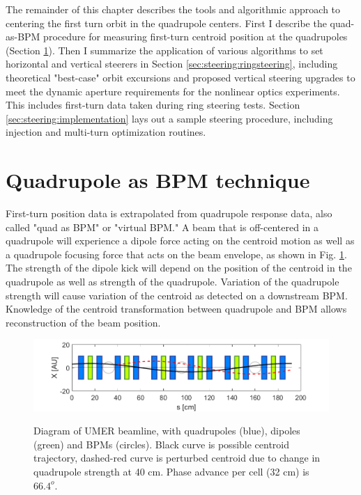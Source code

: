 The remainder of this chapter describes the tools and algorithmic approach to centering the first turn orbit in the quadrupole centers. First I describe the quad-as-BPM procedure for measuring first-turn centroid position at the quadrupoles (Section \ref{sec:steering:quad-as-bpm}). Then I summarize the application of various algorithms to set horizontal and vertical steerers in Section \ref{sec:steering:ringsteering}, including theoretical "best-case" orbit excursions and proposed vertical steering upgrades to meet the dynamic aperture requirements for the nonlinear optics experiments. This includes first-turn data taken during ring steering tests.
Section \ref{sec:steering:implementation} lays out a sample steering procedure, including injection and multi-turn optimization routines. 



 

\section{Quadrupole as BPM technique} \label{sec:steering:quad-as-bpm}

First-turn position data is extrapolated from quadrupole response data, also called "quad as BPM" or "virtual BPM." A beam that is off-centered in a quadrupole will experience a dipole force acting on the centroid motion as well as a quadrupole focusing force that acts on the beam envelope, as shown in Fig. \ref{fig:simple-beamline}. The strength of the dipole kick will depend on the position of the centroid in the quadrupole as well as strength of the quadrupole. Variation of the quadrupole strength will cause variation of the centroid as detected on a downstream BPM. Knowledge of the centroid transformation between quadrupole and BPM allows reconstruction of the beam position. 


\begin{figure}
\begin{center}
\includegraphics[width=\textwidth]{4.figures/simple_beamline.png}
\end{center}
\renewcommand{\baselinestretch}{1}
\small\normalsize
\begin{quote}
\caption[]{Diagram of UMER beamline, with quadrupoles (blue), dipoles (green) and BPMs (circles). Black curve is possible centroid trajectory, dashed-red curve is perturbed centroid due to change in quadrupole strength at 40 cm. Phase advance per cell (32 cm) is $66.4^o$.}
\label{fig:simple-beamline}
\end{quote}
\end{figure} 
\renewcommand{\baselinestretch}{2}
\small\normalsize




